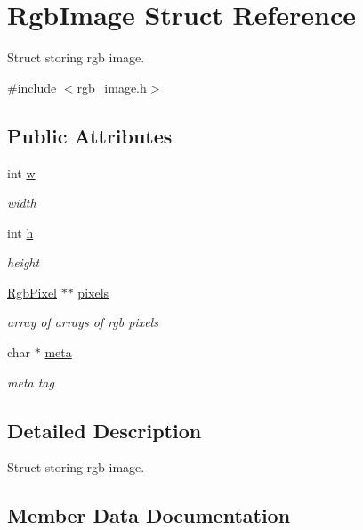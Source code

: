 \hypertarget{structRgbImage}{}\section{Rgb\+Image Struct Reference}
\label{structRgbImage}


Struct storing rgb image.  




{\ttfamily \#include $<$rgb\+\_\+image.\+h$>$}

\subsection*{Public Attributes}
\begin{DoxyCompactItemize}
\item 
int \hyperlink{structRgbImage_a8f1e2b1a24a23e01058dd4b90209f7f9}{w}
\begin{DoxyCompactList}\small\item\em width \end{DoxyCompactList}\item 
int \hyperlink{structRgbImage_a889ca401aeb77b97a42f5202fbe559ef}{h}
\begin{DoxyCompactList}\small\item\em height \end{DoxyCompactList}\item 
\hyperlink{structRgbPixel}{Rgb\+Pixel} $\ast$$\ast$ \hyperlink{structRgbImage_a846169a16a9b57f045ceeb92801537c5}{pixels}
\begin{DoxyCompactList}\small\item\em array of arrays of rgb pixels \end{DoxyCompactList}\item 
char $\ast$ \hyperlink{structRgbImage_a20d971d0023a127ad333b0fdaa55e601}{meta}
\begin{DoxyCompactList}\small\item\em meta tag \end{DoxyCompactList}\end{DoxyCompactItemize}


\subsection{Detailed Description}
Struct storing rgb image. 

\subsection{Member Data Documentation}
\hypertarget{structRgbImage_a889ca401aeb77b97a42f5202fbe559ef}{}
